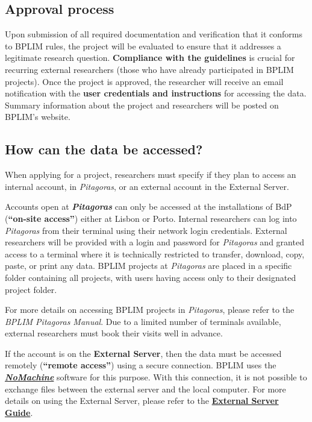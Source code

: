 \documentclass[
  a4paper,
  DIV=11,
  numbers=noendperiod]{scrartcl}
\begin{document}
\hypertarget{approval-process}{%
\subsection{Approval process}\label{approval-process}}

Upon submission of all required documentation and verification that it
conforms to BPLIM rules, the project will be evaluated to ensure that it
addresses a legitimate research question. \textbf{Compliance with the
guidelines} is crucial for recurring external researchers (those who
have already participated in BPLIM projects). Once the project is
approved, the researcher will receive an email notification with the
\textbf{user credentials and instructions} for accessing the data.
Summary information about the project and researchers will be posted on
BPLIM's website.

\hypertarget{how-can-the-data-be-accessed}{%
\subsection{How can the data be
accessed?}\label{how-can-the-data-be-accessed}}

When applying for a project, researchers must specify if they plan to
access an internal account, in \emph{Pitagoras}, or an external account
in the External Server.

Accounts open at \textbf{\emph{Pitagoras}} can only be accessed at the
installations of BdP (\textbf{``on-site access''}) either at Lisbon or
Porto. Internal researchers can log into \emph{Pitagoras} from their
terminal using their network login credentials. External researchers
will be provided with a login and password for \emph{Pitagoras} and
granted access to a terminal where it is technically restricted to
transfer, download, copy, paste, or print any data. BPLIM projects at
\emph{Pitagoras} are placed in a specific folder containing all
projects, with users having access only to their designated project
folder.

For more details on accessing BPLIM projects in \emph{Pitagoras}, please
refer to the \emph{BPLIM Pitagoras Manual}. Due to a limited number of
terminals available, external researchers must book their visits well in
advance.

If the account is on the \textbf{External Server}, then the data must be
accessed remotely (\textbf{``remote access''}) using a secure
connection. BPLIM uses the
\href{https://www.nomachine.com/}{\textbf{\emph{NoMachine}}} software
for this purpose. With this connection, it is not possible to exchange
files between the external server and the local computer. For more
details on using the External Server, please refer to the
\href{https://github.com/BPLIM/Manuals/tree/master/Guides/03_External_Server}{\textbf{External
Server Guide}}.
\end{document}

